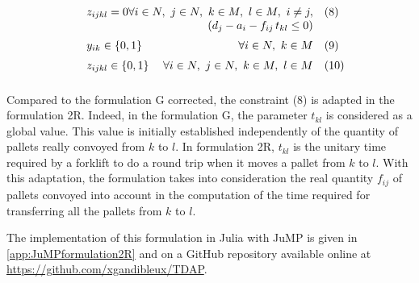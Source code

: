 \documentclass[preprint,12pt,authoryear]{elsarticle}
\begin{document}
\begin{equation*}
\begin{array}{ll@{}ll}
                    & z_{ijkl} = 0   \hfill  \forall i\in N, \ j \in N, \ k \in M, \ l \in M, \  i \neq j, & \quad (8)\\
                    &   \hfill   (d_j - a_i - f_{ij} \, t_{kl} \leq 0) &  \vspace{2mm}\\
                    & y_{ik} \in \{0,1\}   \hfill  \forall i\in N, \ k \in M & \quad  (9) \vspace{2mm}\\
                    & z_{ijkl} \in \{0,1\}   \hfill   \forall i\in N, \ j \in N, \ k \in M, \ l \in M & \quad  (10) 
                    \vspace{2mm}\\
    \end{array}
\end{equation*}

Compared to the formulation G corrected, the constraint (8) is adapted in the formulation 2R.
%
Indeed, in the formulation G, the parameter $t_{kl}$ is considered as a global value. This value is initially established independently of the quantity of pallets really convoyed from $k$ to $l$.
%
In formulation 2R, $t_{kl}$ is the unitary time required by a forklift to do a round trip when it moves a pallet from $k$ to $l$.
With this adaptation, the formulation takes into consideration the real quantity $f_{ij}$ of pallets convoyed into account in the computation of the time required for transferring all the pallets from $k$ to $l$.

The implementation of this formulation in Julia with JuMP is given in \ref{app:JuMPformulation2R} and on a GitHub repository available online at \url{https://github.com/xgandibleux/TDAP}.
\medskip

%
\end{document}
